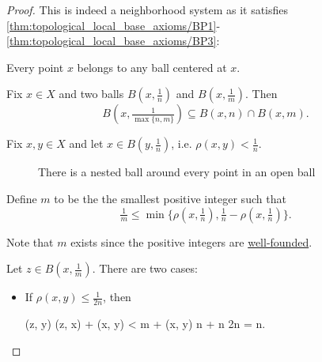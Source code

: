 \begin{proof}
  This is indeed a neighborhood system as it satisfies \ref{thm:topological_local_base_axioms/BP1}-\ref{thm:topological_local_base_axioms/BP3}:

  \begin{refenum}
     Every point \( x \) belongs to any ball centered at \( x \).

     Fix \( x \in X \) and two balls \( B(x, \tfrac 1 n) \) and \( B(x, \tfrac 1 m) \). Then
    \begin{equation*}
      B(x, \tfrac 1 {\max\{ n, m \}}) \subseteq B(x, n) \cap B(x, m).
    \end{equation*}

     Fix \( x, y \in X \) and let \( x \in B(y, \tfrac 1 n) \), i.e. \( \rho(x, y) < \tfrac 1 n \).

    \begin{figure}
      \centering
      \iffalse\begin{mplibcode}
        u := 1cm;
        r := sqrt(2) / 2;

        pair v;
        v := (1, 1);

        beginfig(1);
        draw fullcircle scaled 3u;
        dotlabel.bot("$y$", origin);

        draw fullcircle scaled 1u shifted (-r * u * v);
        dotlabel.bot("$x_1$", -r * u * v);

        draw fullcircle scaled 1u shifted (r/2 * u * v);
        dotlabel.bot("$x_2$", r/2 * u * v);
        endfig;
      \end{mplibcode}\fi
      \caption{There is a nested ball around every point in an open ball}\label{def:metric_topology/nested_balls}
    \end{figure}

    Define \( m \) to be the the smallest positive integer such that
    \begin{equation*}
      \tfrac 1 m \leq \min\{ \rho(x, \tfrac 1 n), \tfrac 1 n - \rho(x, \tfrac 1 n) \}.
    \end{equation*}

    Note that \( m \) exists since the positive integers are \hyperref[def:well_founded_relation]{well-founded}.

    Let \( z \in B(x, \tfrac 1 m) \). There are two cases:
    \begin{itemize}
      \item If \( \rho(x, y) \leq \tfrac 1 {2n} \), then
            \begin{balign*}
              \rho(z, y)
              \leq
              \rho(z, x) + \rho(x, y)
              <
               m + \rho(x, y)
              \leq
               n +  n
                {2n}
              =
               n.
            \end{balign*}


\end{itemize}
\end{refenum}
\end{proof}
